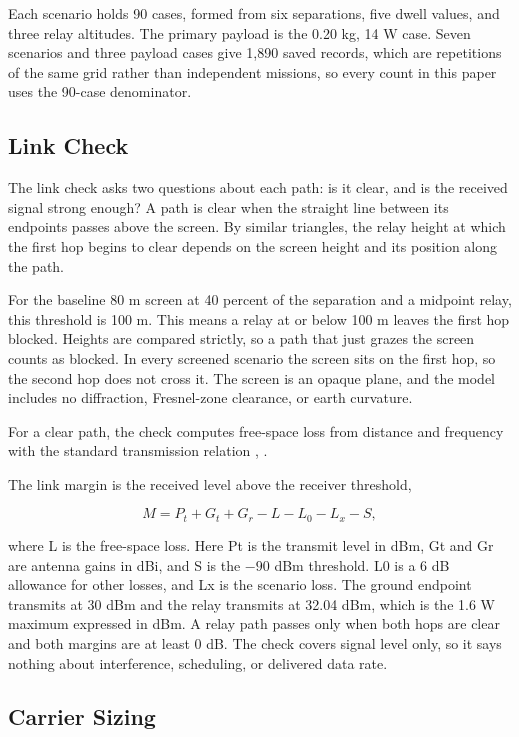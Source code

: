 \documentclass[twocolumn,letterpaper]{IEEEAerospaceCLS}
\begin{document}
Each scenario holds 90 cases, formed from six separations, five dwell values, and three relay altitudes. The primary payload is the 0.20 kg, 14 W case. Seven scenarios and three payload cases give 1,890 saved records, which are repetitions of the same grid rather than independent missions, so every count in this paper uses the 90-case denominator.

\subsection{Link Check}

The link check asks two questions about each path: is it clear, and is the received signal strong enough? A path is clear when the straight line between its endpoints passes above the screen. By similar triangles, the relay height at which the first hop begins to clear depends on the screen height and its position along the path.

For the baseline 80 m screen at 40 percent of the separation and a midpoint relay, this threshold is 100 m. This means a relay at or below 100 m leaves the first hop blocked. Heights are compared strictly, so a path that just grazes the screen counts as blocked. In every screened scenario the screen sits on the first hop, so the second hop does not cross it. The screen is an opaque plane, and the model includes no diffraction, Fresnel-zone clearance, or earth curvature.

For a clear path, the check computes free-space loss from distance and frequency with the standard transmission relation \cite{itu525}, \cite{friis}.

The link margin is the received level above the receiver threshold,

\begin{equation}
M=P_t+G_t+G_r-L-L_0-L_x-S,
\end{equation}

where L is the free-space loss. Here Pt is the transmit level in dBm, Gt and Gr are antenna gains in dBi, and S is the $-90$ dBm threshold. L0 is a 6 dB allowance for other losses, and Lx is the scenario loss. The ground endpoint transmits at 30 dBm and the relay transmits at 32.04 dBm, which is the 1.6 W maximum expressed in dBm. A relay path passes only when both hops are clear and both margins are at least 0 dB. The check covers signal level only, so it says nothing about interference, scheduling, or delivered data rate.

\subsection{Carrier Sizing}
\end{document}
